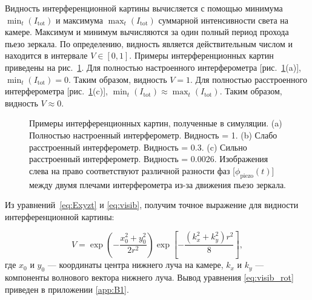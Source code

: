 Видность интерференционной картины вычисляется с помощью минимума $\min_t(I_{\mathrm{tot}})$ и максимума $\max_t(I_{\mathrm{tot}})$ суммарной интенсивности света на камере. Максимум и минимум вычисляются за один полный период прохода пьезо зеркала. По определению, видность является действительным числом и находится в интервале $V \in [0, 1]$. Примеры интерференционных картин приведены на рис.~\ref{fig:visib_expl}. Для полностью настроенного интерферометра [рис.~\ref{fig:visib_expl}(a)], $\min_t(I_{\mathrm{tot}})=0$. Таким образом, видность $V=1$. Для полностью расстроенного интерферометра [рис.~\ref{fig:visib_expl}(c)], $\min_t(I_{\mathrm{tot}})\approx\max_t(I_{\mathrm{tot}})$. Таким образом, видность $V\approx 0$.

\begin{figure}[ht]
\caption{Примеры интерференционных картин, полученные в симуляции. (a) Полностью настроенный интерферометр. Видность = 1. (b) Слабо расстроенный интерферометр. Видность = 0.3. (c) Сильно расстроенный интерферометр. Видность =
0.0026. Изображения слева на право соответствуют различной разности фаз [$\phi_{\mathrm{piezo}}(t)$] между двумя плечами интерферометра из-за движения пьезо зеркала.}
\label{fig:visib_expl}
\end{figure}


Из уравнений~\eqref{eq:Exyzt} и \eqref{eq:visib}, получим точное выражение для видности интерференционной картины:

\begin{equation}
    V = \exp\left(- \frac{x_0^2 + y_0^2}{2 r^2}\right)  \exp\left[- \frac{(k_x^2 + k_y^2) r^2}{8}\right],
    \label{eq:visib_rot}
\end{equation}
где $x_0$ и $y_0$ --- координаты центра нижнего луча на камере, $k_x$ и $k_y$ --- компоненты волнового вектора нижнего луча. Вывод уравнения \eqref{eq:visib_rot} приведен в приложении \ref{app:B1}.

